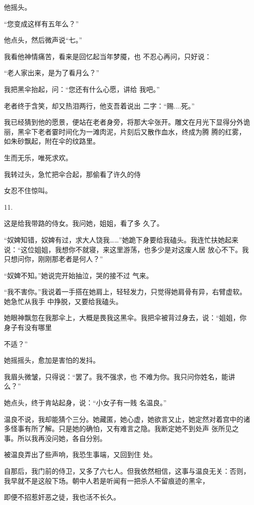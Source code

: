 \documentclass{article}
\begin{document}
他摇头。 


“您变成这样有五年么？” 


他点头，然后微声说“七。” 

\newpage

我看他神情痛苦，看来是回忆起当年梦魇，也
不忍心再问，只好说： 


“老人家出来，是为了看月么？” 


我把黑伞抬起，问：“您还有什么心愿，讲给
我吧。” 

老者终于含笑，却又热泪两行，他支吾着说出
二字：“赐....死。” 

我已经猜到他的愿景，便站在老者身旁，将那大伞张开。雕文在月光下显得分外诡丽，黑伞下老者霎时间化为一滩肉泥，片刻后又散作血水，终成为腾
腾的红雾，如朱砂飘起，附在伞的纹路里。 


生而无乐，唯死求欢。 

我转过头，急忙把伞合起，那偷看了许久的侍

\newpage
女忍不住惊叫。 


11. 

这是给我带路的侍女。我问她，姐姐，看了多
久了。 

“奴婢知错，奴婢有过，求大人饶我……”她跪下身要给我磕头。我连忙扶她起来说：“这位姐姐，我想你不就寝，来这里游荡，也多少是对这废人居
放心不下。我只想问你，刚刚那老者是何人？” 

“奴婢不知。”她说完开始抽泣，哭的接不过
气来。 

“我不害你。”我说着一手搭在她肩上，轻轻发力，只觉得她肩骨有异，右臂虚软。她急忙从我手
中挣脱，又要给我磕头。 

她眼神飘忽在我那伞上，大概是畏我这黑伞。我把伞被背过身去，说：“姐姐，你身子有没有哪里

\newpage
不适？” 


她摇摇头，愈加是害怕的发抖。 

我眉头微皱，只得说：“罢了。我不强求，也
不难为你。我只问你姓名，能讲么？” 

她点头，终于肯站起身，说：“小女子有一贱
名温良。” 

温良不说，我却能猜个三分。她藏匿，她心虚，她欲言又止，她定然对着宫中的诸多怪事有所了解。只是她的确怕，又有难言之隐。我断定她不到处声
张所见之事。所以我再没问她，各自分别。 

被温良弄出了些声响，我恐生事端，又回到住
处。 

自那后，我门前的侍卫，又多了六七人。但我依然相信，这事与温良无关：否则，我早就不是这般下场。朝中人若是听闻有一把杀人不留痕迹的黑伞，

\newpage
即便不招惹奸恶之徒，我也活不长久。 
\end{document}
